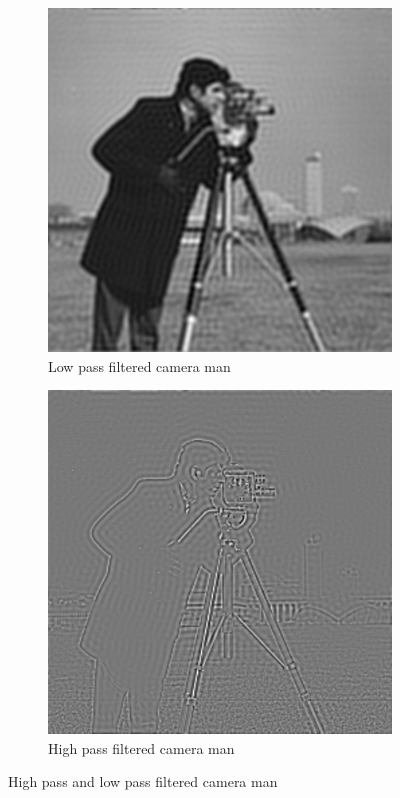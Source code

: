\documentclass[]{article}
\begin{document}
\begin{figure}[H]
     \centering
     \begin{subfigure}[b]{0.45\textwidth}
         \centering
         \includegraphics[width=\textwidth]{camera_low_pass}
         \caption{Low pass filtered camera man}
         \label{fig:cammmmmmmlp}
     \end{subfigure}
     \hfill
     \begin{subfigure}[b]{0.45\textwidth}
         \centering
         \includegraphics[width=\textwidth]{camera_high_pass}
         \caption{High pass filtered camera man}
         \label{fig:gauss_after}
     \end{subfigure}
    \caption{High pass and low pass filtered camera man}
    \label{fig:camera_hplp}
\end{figure}
\end{document}
